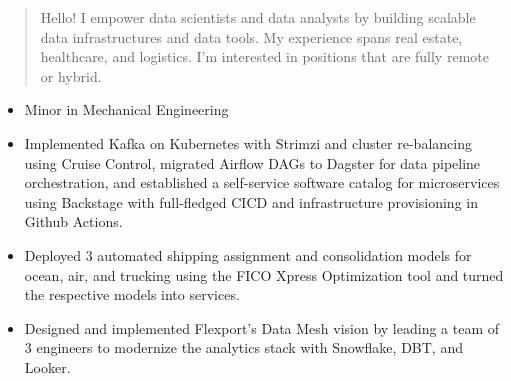 \documentclass[10pt,a4paper,ragged2e,withhyper]{altacv}
\begin{document}
\begin{paracol}{2}




  \newpage

  \switchcolumn

  \begin{quote}
    Hello! I empower data scientists and data analysts by building scalable data infrastructures and data tools. My experience spans real estate, healthcare, and logistics. I'm interested in positions that are fully remote or hybrid.
  \end{quote}
  \begin{itemize}
    \item Minor in Mechanical Engineering
  \end{itemize}
  \begin{itemize}
    \item Implemented Kafka on Kubernetes with Strimzi and cluster re-balancing using Cruise Control, migrated Airflow DAGs to Dagster for data pipeline orchestration, and established a self-service software catalog for microservices using Backstage with full-fledged CICD and infrastructure provisioning in Github Actions.
    \item Deployed 3 automated shipping assignment and consolidation models for ocean, air, and trucking using the FICO Xpress Optimization tool and turned the respective models into services.
    \item Designed and implemented Flexport's Data Mesh vision by leading a team of 3 engineers to modernize the analytics stack with Snowflake, DBT, and Looker.
  \end{itemize}
  \divider


\end{paracol}
\end{document}

